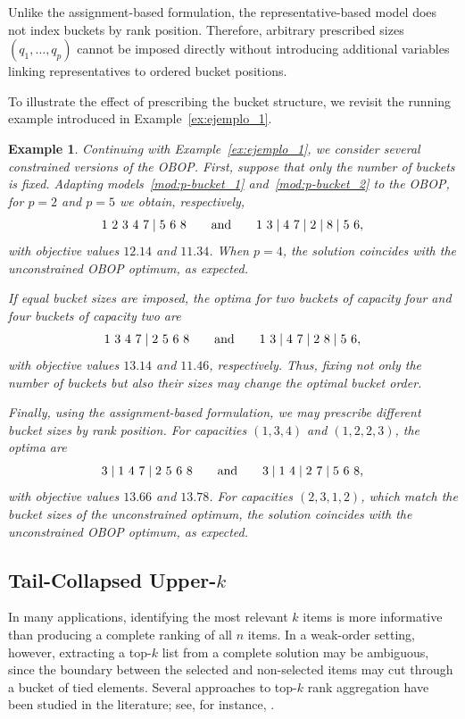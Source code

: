 \documentclass[pdflatex,basic,Numbered]{jnl}%
\theoremstyle{plain}
\newtheorem{example}{Example}
\theoremstyle{remark}
\theoremstyle{thmstyleone}%
\theoremstyle{thmstylethree}%
\begin{document}
Unlike the assignment-based formulation, the representative-based model does not index buckets by rank position. Therefore, arbitrary prescribed sizes \((q_1,\dots,q_p)\) cannot be imposed directly without introducing additional variables linking representatives to ordered bucket positions.

To illustrate the effect of prescribing the bucket structure, we revisit the running example introduced in Example~\ref{ex:ejemplo_1}.

\begin{example}\label{ex:ejemplo_2}
Continuing with Example~\ref{ex:ejemplo_1}, we consider several constrained versions of the {\rm OBOP}. First, suppose that only the number of buckets is fixed. Adapting models~\eqref{mod:p-bucket_1} and~\eqref{mod:p-bucket_2} to the {\rm OBOP}, for \(p=2\) and \(p=5\) we obtain, respectively,
\[
{\rm 1\ 2\ 3\ 4\ 7 \mid 5\ 6\ 8}
\qquad\text{and}\qquad
{\rm 1\ 3 \mid 4\ 7 \mid 2 \mid 8 \mid 5\ 6},
\]
with objective values \(12.14\) and \(11.34\). When \(p=4\), the solution coincides with the unconstrained {\rm OBOP} optimum, as expected.

If equal bucket sizes are imposed, the optima for two buckets of capacity four and four buckets of capacity two are
\[
{\rm 1\ 3\ 4\ 7 \mid 2\ 5\ 6\ 8}
\qquad\text{and}\qquad
{\rm 1\ 3 \mid 4\ 7 \mid 2\ 8 \mid 5\ 6},
\]
with objective values \(13.14\) and \(11.46\), respectively. Thus, fixing not only the number of buckets but also their sizes may change the optimal bucket order.

Finally, using the assignment-based formulation, we may prescribe different bucket sizes by rank position. For capacities \((1,3,4)\) and \((1,2,2,3)\), the optima are
\[
{\rm 3 \mid 1\ 4\ 7 \mid 2\ 5\ 6\ 8}
\qquad\text{and}\qquad
{\rm 3 \mid 1\ 4 \mid 2\ 7 \mid 5\ 6\ 8},
\]
with objective values \(13.66\) and \(13.78\). For capacities \((2,3,1,2)\), which match the bucket sizes of the unconstrained optimum, the solution coincides with the unconstrained {\rm OBOP} optimum, as expected.
\end{example}

\subsection{Tail-Collapsed Upper-\texorpdfstring{$k$}{k}}
\label{Sec:TCU}

In many applications, identifying the most relevant \(k\) items is more informative than producing a complete ranking of all \(n\) items. In a weak-order setting, however, extracting a top-\(k\) list from a complete solution may be ambiguous, since the boundary between the selected and non-selected items may cut through a bucket of tied elements. Several approaches to top-\(k\) rank aggregation have been studied in the literature; see, for instance, \cite{lin2010rank}.
\end{document}
